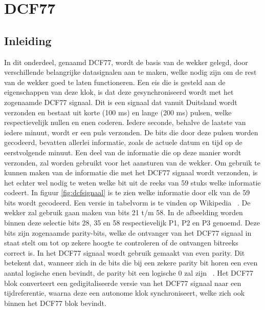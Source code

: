 \chapter{DCF77}
\section{Inleiding}
In dit onderdeel, genaamd DCF77,  wordt de basis van de wekker gelegd, door verschillende belangrijke datasignalen aan te maken, welke nodig zijn om de rest van de wekker goed te laten functioneren. Een eis die is gesteld aan de eigenschappen van deze klok, is dat deze gesynchroniseerd wordt met het zogenaamde DCF77 signaal. Dit is een signaal dat vanuit Duitsland wordt verzonden en bestaat uit korte (100 ms) en lange (200 ms) pulsen, welke respectievelijk nullen en enen coderen. Iedere seconde, behalve de laatste van iedere minuut, wordt er een puls verzonden. De bits die door deze pulsen worden gecodeerd, bevatten allerlei informatie, zoals de actuele datum en tijd op de eerstvolgende minuut. Een deel van de informatie die op deze manier wordt verzonden, zal worden gebruikt voor het aansturen van de wekker. Om gebruik te kunnen maken van de informatie die met het DCF77 signaal wordt verzonden, is het echter wel nodig te weten welke bit uit de reeks van 59 stuks welke informatie codeert. In figuur \ref{fig:dcfsignaal} is te zien welke informatie door elk van de 59 bits wordt gecodeerd. Een versie in tabelvorm is te vinden op Wikipedia ~\cite{Tijdwiki}. De wekker zal gebruik gaan maken van bits 21 t/m 58. In de afbeelding worden binnen deze selectie bits 28, 35 en 58 respectievelijk P1, P2 en P3 genoemd. Deze bits zijn zogenaamde parity-bits, welke de ontvanger van het DCF77 signaal in staat stelt om tot op zekere hoogte te controleren of de ontvangen bitreeks correct is. In het DCF77 signaal wordt gebruik gemaakt van even parity. Dit betekent dat, wanneer zich in de bits die bij een zekere parity bit horen een even aantal logische enen bevindt, de parity bit een logische 0 zal zijn ~\cite{Tijdscodering}. Het DCF77 blok converteert een gedigitaliseerde versie van het DCF77 signaal naar een tijdreferentie, waarna deze een autonome klok synchroniseert, welke zich ook binnen het DCF77 blok bevindt.

